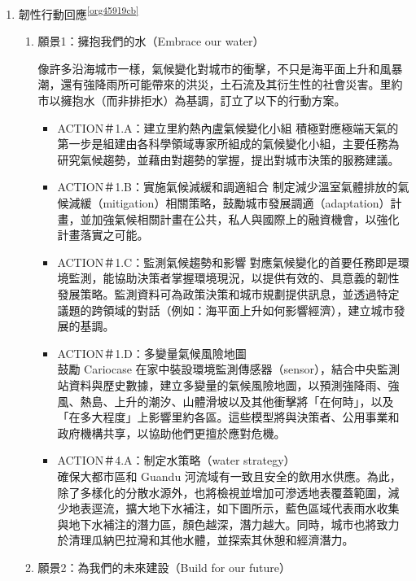 \documentclass[a4paper,12pt]{article}
\begin{document}
\begin{enumerate}
\begin{enumerate}
\item 韌性行動回應\textsuperscript{\ref{org45919cb}}
\label{sec:orgbae6871}

\begin{enumerate}
\item 願景1：擁抱我們的水（Embrace our water）
\label{sec:orgbc80623}

像許多沿海城市一樣，氣候變化對城市的衝擊，不只是海平面上升和風暴潮，還有強降雨所可能帶來的洪災，土石流及其衍生性的社會災害。里約市以擁抱水（而非排拒水）為基調，訂立了以下的行動方案。\\
\begin{itemize}
\item ACTION＃1.A：建立里約熱內盧氣候變化小組  積極對應極端天氣的第一步是組建由各科學領域專家所組成的氣候變化小組，主要任務為研究氣候趨勢，並藉由對趨勢的掌握，提出對城市決策的服務建議。\\
\item ACTION＃1.B：實施氣候減緩和調適組合  制定減少溫室氣體排放的氣候減緩（mitigation）相關策略，鼓勵城市發展調適（adaptation）計畫，並加強氣候相關計畫在公共，私人與國際上的融資機會，以強化計畫落實之可能。\\
\item ACTION＃1.C：監測氣候趨勢和影響  對應氣候變化的首要任務即是環境監測，能協助決策者掌握環境現況，以提供有效的、具意義的韌性發展策略。監測資料可為政策決策和城市規劃提供訊息，並透過特定議題的跨領域的對話（例如：海平面上升如何影響經濟），建立城市發展的基調。\\
\item ACTION＃1.D：多變量氣候風險地圖\\
鼓勵 Cariocase 在家中裝設環境監測傳感器（sensor），結合中央監測站資料與歷史數據，建立多變量的氣候風險地圖，以預測強降雨、強風、熱島、上升的潮汐、山體滑坡以及其他衝擊將「在何時」，以及「在多大程度」上影響里約各區。這些模型將與決策者、公用事業和政府機構共享，以協助他們更擅於應對危機。\\
\item ACTION＃4.A：制定水策略（water strategy）\\
確保大都市區和 Guandu 河流域有一致且安全的飲用水供應。為此，除了多樣化的分散水源外，也將檢視並增加可滲透地表覆蓋範圍，減少地表逕流，擴大地下水補注，如下圖所示，藍色區域代表雨水收集與地下水補注的潛力區，顏色越深，潛力越大。同時，城市也將致力於清理瓜納巴拉灣和其他水體，並探索其休憩和經濟潛力。\\
\end{itemize}
\item 願景2：為我們的未來建設（Build for our future）
\label{sec:org7e97bff}


\end{enumerate}
\end{enumerate}
\end{enumerate}
\end{document}
